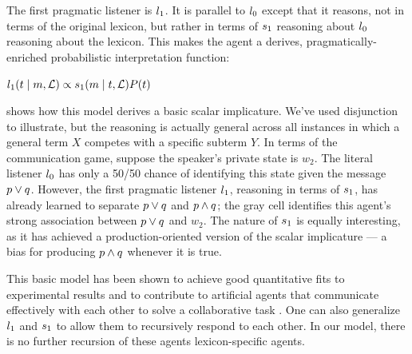 \documentclass{article}
\begin{document}
The first pragmatic listener is $l_{1}$. It is parallel to
$l_{0}$ except that it reasons, not in terms of the original
lexicon, but rather in terms of $s_{1}$ reasoning about
$l_{0}$ reasoning about the lexicon. This makes the agent a
derives, pragmatically-enriched probabilistic interpretation function:
%
\begin{examples}
\item\label{l1}%
  $l_{1}(t \mid m, \mathcal{L}) \propto 
  s_{1}(m \mid t, \mathcal{L})
  P(t)$
\end{examples}

 shows how this model derives a basic scalar
implicature. We've used disjunction to illustrate, but the reasoning
is actually general across all instances in which a general term $X$
competes with a specific subterm $Y$. In terms of the communication
game, suppose the speaker's private state is $w_{2}$. The literal
listener $l_{0}$ has only a 50/50 chance of identifying this
state given the message $p \vee q$.  However, the first pragmatic
listener $l_{1}$, reasoning in terms of $s_{1}$, has
already learned to separate $p \vee q$ and $p \wedge q$; the gray cell
identifies this agent's strong association between $p \vee q$ and
$w_{2}$. The nature of $s_{1}$ is equally interesting, as it has
achieved a production-oriented version of the scalar implicature --- a
bias for producing $p \wedge q$ whenever it is true.

This basic model has been shown to achieve good quantitative fits to
experimental results
\citep{Degen:Franke:2012,Stiller:Goodman:Frank:2011} and to contribute
to artificial agents that communicate effectively with each other to
solve a collaborative task \citep{Vogel-etal:2013}. One can also
generalize $l_{1}$ and $s_{1}$ to allow them to
recursively respond to each other. In our model, there is no further
recursion of these agents lexicon-specific agents.
\end{document}
